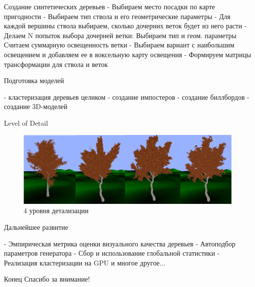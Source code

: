 \documentclass[11pt]{beamer}
\begin{document}
\begin{frame}{Создание синтетических деревьев}
- Выбираем место посадки по карте пригодности\linebreak	
- Выбираем тип ствола и его геометрические параметры\linebreak	
- Для каждой вершины ствола выбираем, сколько дочерних веток будет из него расти\linebreak	
- Делаем N попыток выбора дочерней ветки:\linebreak	
  Выбираем тип и геом. параметры\linebreak	
  Считаем суммарную освещенность ветки\linebreak	
- Выбираем вариант с наибольшим освещением и добавляем ее в воксельную карту освещения\linebreak	
- Формируем матрицы трансформации для ствола и веток\linebreak	
\end{frame}
\begin{frame}{Подготовка моделей}

- кластеризация деревьев целиком\linebreak
- создание импостеров\linebreak
- создание биллбордов\linebreak
- создание 3D-моделей\linebreak
\end{frame}
\begin{frame}{Level of Detail}
\begin{figure}[hbtp]
\includegraphics[scale=0.11]{lods.png}
\caption{4 уровня детализации}
\end{figure}
\end{frame}
\begin{frame}{Дальнейшее развитие}

- Эмпирическая метрика оценки визуального качества деревьев\linebreak
- Автоподбор параметров генератора\linebreak
- Сбор и использование глобальной статистики\linebreak
- Реализация кластеризации на GPU\linebreak
и многое другое...
\end{frame}
\begin{frame}{Конец}
Спасибо за внимание!
\end{frame}
\end{document}
